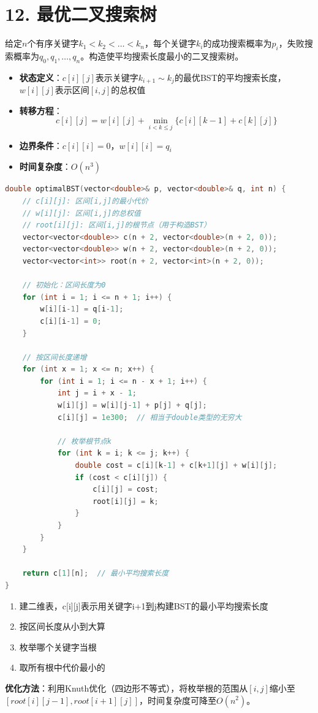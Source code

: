 \section*{12. 最优二叉搜索树}

给定$n$个有序关键字$k_1 < k_2 < \ldots < k_n$，每个关键字$k_i$的成功搜索概率为$p_i$，失败搜索概率为$q_0,q_1,\ldots,q_n$。构造使平均搜索长度最小的二叉搜索树。



\begin{itemize}
    \item \textbf{状态定义}：$c[i][j]$表示关键字$k_{i+1} \sim k_j$的最优BST的平均搜索长度，$w[i][j]$表示区间$[i,j]$的总权值
    \item \textbf{转移方程}：$$c[i][j] = w[i][j] + \min_{i < k \le j} \{c[i][k-1] + c[k][j]\}$$
    \item \textbf{边界条件}：$c[i][i] = 0$，$w[i][i] = q_i$
    \item \textbf{时间复杂度}：$O(n^3)$
\end{itemize}
\begin{lstlisting}[language=C++, style=cppstyle]
double optimalBST(vector<double>& p, vector<double>& q, int n) {
    // c[i][j]: 区间[i,j]的最小代价
    // w[i][j]: 区间[i,j]的总权值
    // root[i][j]: 区间[i,j]的根节点（用于构造BST）
    vector<vector<double>> c(n + 2, vector<double>(n + 2, 0));
    vector<vector<double>> w(n + 2, vector<double>(n + 2, 0));
    vector<vector<int>> root(n + 2, vector<int>(n + 2, 0));

    // 初始化：区间长度为0
    for (int i = 1; i <= n + 1; i++) {
        w[i][i-1] = q[i-1];
        c[i][i-1] = 0;
    }

    // 按区间长度递增
    for (int x = 1; x <= n; x++) {
        for (int i = 1; i <= n - x + 1; i++) {
            int j = i + x - 1;
            w[i][j] = w[i][j-1] + p[j] + q[j];
            c[i][j] = 1e300;  // 相当于double类型的无穷大

            // 枚举根节点k
            for (int k = i; k <= j; k++) {
                double cost = c[i][k-1] + c[k+1][j] + w[i][j];
                if (cost < c[i][j]) {
                    c[i][j] = cost;
                    root[i][j] = k;
                }
            }
        }
    }

    return c[1][n];  // 最小平均搜索长度
}
\end{lstlisting}


\begin{enumerate}
    \item 建二维表，c[i][j]表示用关键字i+1到j构建BST的最小平均搜索长度
    \item 按区间长度从小到大算
    \item 枚举哪个关键字当根
    \item 取所有根中代价最小的
\end{enumerate}


\textbf{优化方法}：利用Knuth优化（四边形不等式），将枚举根的范围从$[i,j]$缩小至$[root[i][j-1], root[i+1][j]]$，时间复杂度可降至$O(n^2)$。

